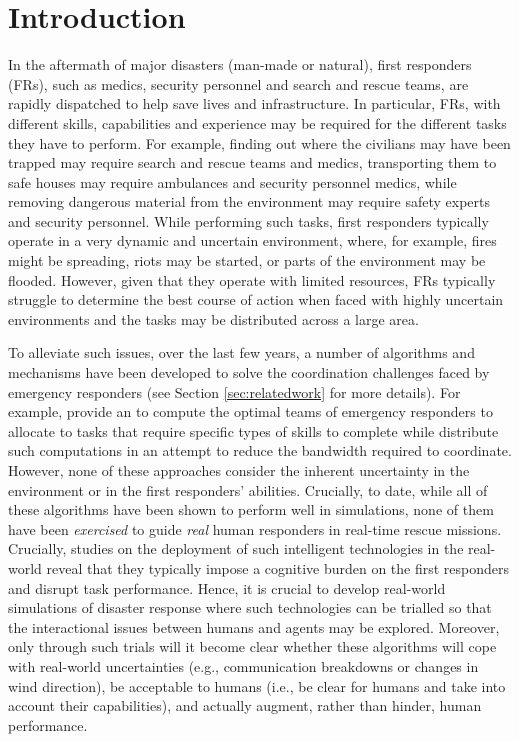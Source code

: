 \section{Introduction}
In the aftermath of major disasters (man-made or natural), first responders  (FRs), such as medics, security personnel and search and rescue teams, are  rapidly dispatched to help save lives and infrastructure. In particular, FRs, with different skills, capabilities and experience may be required for the different tasks they have to perform.  For example, finding out where the civilians may have been trapped  may require search and rescue teams and medics, transporting them to safe houses may require ambulances and security personnel medics, while  removing dangerous material from the environment may require safety experts and security personnel. While performing such tasks, first responders typically operate in a very dynamic and uncertain environment, where, for example, fires might be spreading, riots may be started, or parts of the environment may be flooded. However, given that they operate with limited resources, FRs typically struggle to determine the best course of action when faced with highly uncertain environments and the tasks may be distributed across a large area. 

To alleviate such issues, over the last few years, a number of  algorithms  and mechanisms have been developed to solve the coordination challenges faced by emergency responders  (see Section \ref{sec:relatedwork} for more details). For example, \cite{ramchurn:etal:2010} provide an to compute the optimal teams of emergency responders to allocate to tasks that require specific types of skills to complete while \cite{Chapman2009,puyol:etal:2014} distribute such computations in an attempt to reduce the bandwidth required to coordinate. However, none of these approaches consider the inherent uncertainty in the environment or in the first responders' abilities. Crucially, to date, while all of these algorithms have been shown to perform well in simulations, none of them have been \emph{exercised} to guide \emph{real} human responders in real-time rescue missions. Crucially,  studies on the deployment of such intelligent technologies in the real-world reveal that they typically impose a cognitive burden on the first responders \cite{Rachlin1997,Moran2013} and disrupt task performance.  Hence, it is crucial to develop real-world simulations of disaster response where such technologies can be trialled so that  the interactional issues between humans and agents may be explored. Moreover, only through such trials will it become clear whether these algorithms will cope with real-world uncertainties (e.g., communication breakdowns or changes in wind direction), be acceptable to humans (i.e., be clear for humans and take into account their capabilities), and actually augment, rather than hinder,  human performance.


